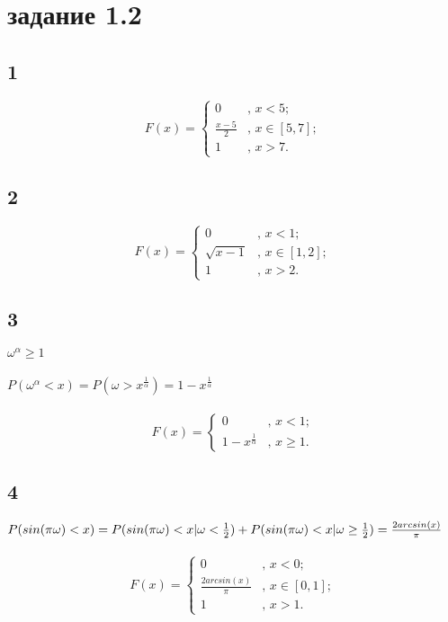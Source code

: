 \documentclass[a4paper]{article}
\begin{document}
	\section*{задание 1.2}
	\begin{large}
		\subsection*{1}
		\[ F(x) = \left\{ \begin{array}{ll}
			0 & \mbox{, $x<5$};\\
			\frac{x-5}{2} & \mbox{, $x \in [5, 7]$};\\
			1 & \mbox{, $x>7$}.\end{array} \right. \]
		\subsection*{2}
			\[ F(x) = \left\{ \begin{array}{ll}
			0 & \mbox{, $x<1$};\\
			\sqrt{x-1} & \mbox{, $x \in [1, 2]$};\\
			1 & \mbox{, $x>2$}.\end{array} \right. \]
		\subsection*{3}
		$\omega^{\alpha}\ge 1$\\
		\\
		$P(\omega^{\alpha}<x)=P(\omega > x^{\frac{1}{\alpha}})=1-x^{\frac{1}{\alpha}}$\\
		\\
		\[ F(x) = \left\{ \begin{array}{ll}
			0 & \mbox{, $x<1$};\\
			1-x^{\frac{1}{\alpha}} & \mbox{, $x\ge 1$}.\end{array} \right. \]
		\subsection*{4}
		$P(sin(\pi \omega)<x)=P(sin(\pi \omega)<x |\omega<\frac{1}{2})+P(sin(\pi \omega)<x |\omega \ge \frac{1}{2})\\=
		\frac{2arcsin(x)}{\pi}$\\
		\\
		\[ F(x) = \left\{ \begin{array}{ll}
			0 & \mbox{, $x<0$};\\
			\frac{2arcsin(x)}{\pi} & \mbox{, $x \in [0,1]$};\\
			1 & \mbox{, $x>1$}.\end{array} \right. \]

\end{large}
\end{document}
